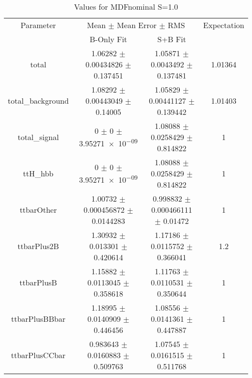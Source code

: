 \begin{table}
\centering
\caption{Values for MDFnominal S=1.0}
\begin{tabular}{cccc}
\toprule
Parameter & \multicolumn{2}{c}{Mean $\pm$ Mean Error $\pm$ RMS} & Expectation\\
 & B-Only Fit & S+B Fit & \\
\midrule
total & \num{1.06282} $\pm$ \num{0.00434826} $\pm$ \num{0.137451} & \num{1.05871} $\pm$ \num{0.0043492} $\pm$ \num{0.137481} & \num{1.01364}\\
total\_background & \num{1.08292} $\pm$ \num{0.00443049} $\pm$ \num{0.14005} & \num{1.05829} $\pm$ \num{0.00441127} $\pm$ \num{0.139442} & \num{1.01403}\\
total\_signal & \num{0} $\pm$ \num{0} $\pm$ \num{3.95271e-09} & \num{1.08088} $\pm$ \num{0.0258429} $\pm$ \num{0.814822} & \num{1}\\
ttH\_hbb & \num{0} $\pm$ \num{0} $\pm$ \num{3.95271e-09} & \num{1.08088} $\pm$ \num{0.0258429} $\pm$ \num{0.814822} & \num{1}\\
ttbarOther & \num{1.00732} $\pm$ \num{0.000456872} $\pm$ \num{0.0144283} & \num{0.998832} $\pm$ \num{0.000466111} $\pm$ \num{0.01472} & \num{1}\\
ttbarPlus2B & \num{1.30932} $\pm$ \num{0.013301} $\pm$ \num{0.420614} & \num{1.17186} $\pm$ \num{0.0115752} $\pm$ \num{0.366041} & \num{1.2}\\
ttbarPlusB & \num{1.15882} $\pm$ \num{0.0113045} $\pm$ \num{0.358618} & \num{1.11763} $\pm$ \num{0.0110531} $\pm$ \num{0.350644} & \num{1}\\
ttbarPlusBBbar & \num{1.18995} $\pm$ \num{0.0140909} $\pm$ \num{0.446456} & \num{1.08556} $\pm$ \num{0.0141361} $\pm$ \num{0.447887} & \num{1}\\
ttbarPlusCCbar & \num{0.983643} $\pm$ \num{0.0160883} $\pm$ \num{0.509763} & \num{1.07545} $\pm$ \num{0.0161515} $\pm$ \num{0.511768} & \num{1}\\
\bottomrule
\end{tabular}
\end{table}